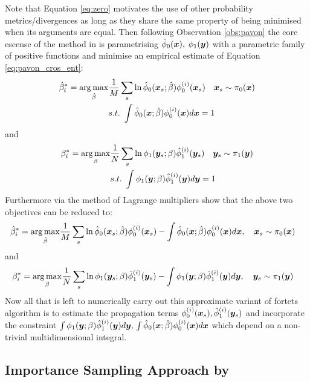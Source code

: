\documentclass[a4paper,12pt,twoside,openright]{report}
\theoremstyle{definition}
\begin{document}
Note that Equation \ref{eq:zero} motivates the use of other probability metrics/divergences as long as they share the same property of being minimised  when its arguments are equal. Then following Observation \ref{obs:pavon} the core escense of the method in \cite{pavon2018data} is parametrising  ${\hat{\phi}}_0({\bm{x}}), \;  \phi_1({\bm{y}}) $ with a parametric family of positive functions and minimise an empirical estimate of Equation \ref{eq:pavon_cros_ent}:
\begin{align}
    \hat{\beta}^*_i = \operatorname*{arg\,max}_{\hat{\beta} } &\frac{1}{M} \sum_s \operatorname{ln} {\hat{\phi}}_0({\bm{x}}_s; \hat{\beta} )   \phi_0^{(i)}({\bm{x}}_s)
    \quad {\bm{x}}_s\sim \pi_0({\bm{x}}) \nonumber \\
   & s.t. \text{ }  \int {\hat{\phi}}_0({\bm{x}}; \hat{\beta} )   \phi_0^{(i)}({\bm{x}}) d{\bm{x}} =1
\end{align}
and
\begin{align}
    {\beta}^*_i = \operatorname*{arg\,max}_{{\beta} } &\frac{1}{N} \sum_s \operatorname{ln} \phi_1({\bm{y}}_s; {\beta} )   {\hat{\phi}}_1^{(i)}({\bm{y}}_s)
    \quad {\bm{y}}_s\sim \pi_1({\bm{y}}) \nonumber \\
   & s.t. \text{ }  \int \phi_1({\bm{y}}; {\beta} )   {\hat{\phi}}_1^{(i)}({\bm{y}}) d{\bm{y}} =1
\end{align}
Furthermore via the method of Lagrange multipliers \cite{pavon1991free} show that the above two objectives can be reduced to:
\begin{align}
    \hat{\beta}^*_i = \operatorname*{arg\,max}_{\hat{\beta} } &\frac{1}{M} \sum_s \operatorname{ln} {\hat{\phi}}_0({\bm{x}}_s; \hat{\beta} )   \phi_0^{(i)}({\bm{x}}_s)- \int {\hat{\phi}}_0({\bm{x}}; \hat{\beta} )   \phi_0^{(i)}({\bm{x}}) d{\bm{x}} ,
    \quad {\bm{x}}_s\sim \pi_0({\bm{x}})   \nonumber 
\end{align}
and
\begin{align}
    {\beta}^*_i = \operatorname*{arg\,max}_{{\beta} } &\frac{1}{N} \sum_s \operatorname{ln} \phi_1({\bm{y}}_s; {\beta} )   {\hat{\phi}}_1^{(i)}({\bm{y}}_s)- \int \phi_1({\bm{y}}; {\beta} )   {\hat{\phi}}_1^{(i)}({\bm{y}}) d{\bm{y}} ,
    \quad {\bm{y}}_s\sim \pi_1({\bm{y}}) \nonumber 
\end{align}
Now all that is left to numerically carry out this approximate variant of fortets algorithm is to estimate the propagation terms $ \phi_0^{(i)}({\bm{x}}_s), {\hat{\phi}}_1^{(i)}({\bm{y}}_s)$ and incorporate the constraint $\int \phi_1({\bm{y}}; {\beta} )   {\hat{\phi}}_1^{(i)}({\bm{y}}) d{\bm{y}}, \, \int {\hat{\phi}}_0({\bm{x}}; \hat{\beta} )   \phi_0^{(i)}({\bm{x}}) d{\bm{x}} $ which depend on a non-trivial multidimensional integral.


\subsection{Importance Sampling Approach by \citet{pavon2018data} }
\end{document}
